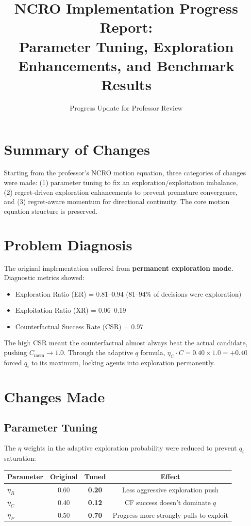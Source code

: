 \documentclass[10pt,twocolumn]{article}
\title{\textbf{NCRO Implementation Progress Report:\\Parameter Tuning, Exploration Enhancements, and Benchmark Results}}
\author{Progress Update for Professor Review}
\date{}
\begin{document}
\maketitle

\section{Summary of Changes}

Starting from the professor's NCRO motion equation, three categories of changes were made: (1) parameter tuning to fix an exploration/exploitation imbalance, (2) regret-driven exploration enhancements to prevent premature convergence, and (3) regret-aware momentum for directional continuity. The core motion equation structure is preserved.

\section{Problem Diagnosis}

The original implementation suffered from \textbf{permanent exploration mode}. Diagnostic metrics showed:
\begin{itemize}[nosep]
\item Exploration Ratio (ER) = 0.81--0.94 (81--94\% of decisions were exploration)
\item Exploitation Ratio (XR) = 0.06--0.19
\item Counterfactual Success Rate (CSR) = 0.97
\end{itemize}

The high CSR meant the counterfactual almost always beat the actual candidate, pushing $C_{\text{mem}} \to 1.0$. Through the adaptive $q$ formula, $\eta_C \cdot C = 0.40 \times 1.0 = +0.40$ forced $q_i$ to its maximum, locking agents into exploration permanently.

\section{Changes Made}

\subsection{Parameter Tuning}

The $\eta$ weights in the adaptive exploration probability were reduced to prevent $q_i$ saturation:

\begin{center}
\begin{tabular}{lccc}
\toprule
Parameter & Original & Tuned & Effect \\
\midrule
$\eta_R$ & 0.60 & \textbf{0.20} & Less aggressive exploration push \\
$\eta_C$ & 0.40 & \textbf{0.12} & CF success doesn't dominate $q$ \\
$\eta_P$ & 0.50 & \textbf{0.70} & Progress more strongly pulls to exploit \\
\bottomrule
\end{tabular}
\end{center}
\end{document}
